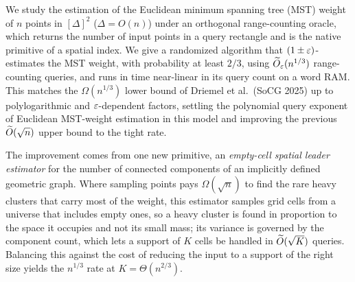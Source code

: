 We study the estimation of the Euclidean minimum spanning tree (MST) weight of $n$ points in $[\Delta]^2$
($\Delta=O(n)$) under an orthogonal range-counting oracle, which returns the number of input points in a
query rectangle and is the native primitive of a spatial index. We give a randomized algorithm that
$(1\pm\varepsilon)$-estimates the MST weight, with probability at least $2/3$, using $\widetilde{O}_\varepsilon(n^{1/3})$
range-counting queries, and runs in time near-linear in its query count on a word RAM. This matches the $\Omega(n^{1/3})$ lower bound of Driemel et al.\ (SoCG
2025) up to polylogarithmic and $\varepsilon$-dependent factors, settling the polynomial query exponent of
Euclidean MST-weight estimation in this model and improving the previous $\widetilde{O}(\sqrt n)$ upper bound to
the tight rate.

The improvement comes from one new primitive, an \emph{empty-cell spatial leader estimator} for the number
of connected components of an implicitly defined geometric graph. Where sampling points pays $\Omega(\sqrt
n)$ to find the rare heavy clusters that carry most of the weight, this estimator samples grid cells from a
universe that includes empty ones, so a heavy cluster is found in proportion to the space it occupies and
not its small mass; its variance is governed by the component count, which lets a support of $K$ cells be
handled in $\widetilde{O}(\sqrt K)$ queries. Balancing this against the cost of reducing the input to a support of
the right size yields the $n^{1/3}$ rate at $K=\Theta(n^{2/3})$.
